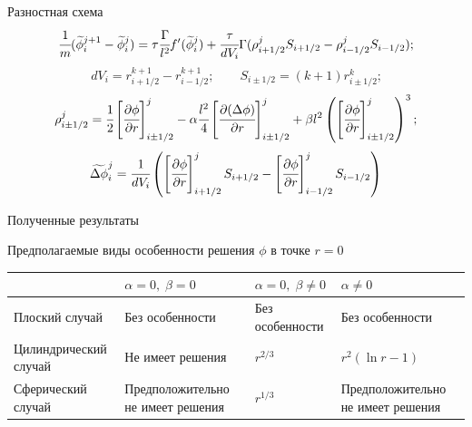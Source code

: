 \begin{frame}{Разностная схема}
$$\cfrac{1}{m} (\widetilde{\phi}_i^{j + 1} - \widetilde{\phi}_i^j) = \tau \cfrac{\Gamma}{l^2}
f'(\widetilde{\phi}_i^j) + \cfrac{\tau}{dV_i} \Gamma (\rho_{i + 1/2}^j S_{i + 1/2} -
\rho_{i - 1/2}^j S_{i - 1/2}) \text{;}$$
$$dV_i = r_{i + 1/2}^{k + 1} - r_{i - 1/2}^{k + 1}; \qquad
S_{i \pm 1/2} = (k + 1) r_{i \pm 1/2}^k \text{;}$$
$$\rho_{i \pm 1/2}^j = \cfrac{1}{2}
\left[ \cfrac{\partial \phi}{\partial r} \right]_{i \pm 1/2}^j -
\alpha \cfrac{l^2}{4} \left[ \cfrac{\partial (\Delta \phi)}{\partial r} \right]_{i \pm 1/2}^j +
\beta l^2 \left( \left[ \cfrac{\partial \phi}{\partial r} \right]_{i \pm 1/2}^j \right)^3
\text{;}$$
$$\widetilde{\Delta \phi}_i^j = \cfrac{1}{dV_i}
\left( \left[ \cfrac{\partial \phi}{\partial r} \right]_{i + 1/2}^j S_{i + 1/2} -
\left[ \cfrac{\partial \phi}{\partial r} \right]_{i - 1/2}^j S_{i - 1/2} \right)$$
\end{frame}


\begin{frame}{Полученные результаты}
\vspace{-1cm}
\begin{center}
	Предполагаемые виды особенности решения $\phi$ в точке $r = 0$
\end{center}
\begin{tabular}{|m{3cm}||m{3.5cm}|m{3.5cm}|m{3.5cm}|}
	\hline
	\vspace*{2mm} \hfill \vspace*{2mm} &\centering $\alpha = 0, \; \beta = 0$ &
	\centering $\alpha = 0, \; \beta \neq 0$ & \centering \arraybackslash $\alpha \neq 0$ \\
	\hline
	\hline
	\vspace{2mm} Плоский \linebreak случай \vspace{2mm} &
	Без особенности & Без особенности & Без особенности \\
	\hline
	\vspace{2mm} Цилиндрический \linebreak случай \vspace{2mm} &
	Не имеет решения & $r^{2/3}$ & $r^2 (\ln r - 1)$ \\
	\hline
	\vspace{2mm} Сферический \linebreak случай \vspace{2mm} &
	Предположительно не имеет решения & $r^{1/3}$ & Предположительно
	не имеет решения \\
	\hline
\end{tabular}
\end{frame}


